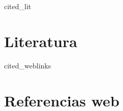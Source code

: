 \thispagestyle{empty}



\begin{btSect}[plain]{cited_lit}
\section*{Literatura}
\setlength{\bibhang}{2em}
\btPrintCited
\end{btSect}

\nocite{*} 
\begin{btSect}[plain]{cited_weblinks}
\section*{Referencias web}
\setlength{\bibhang}{2em}
\btPrintCited
\end{btSect}
